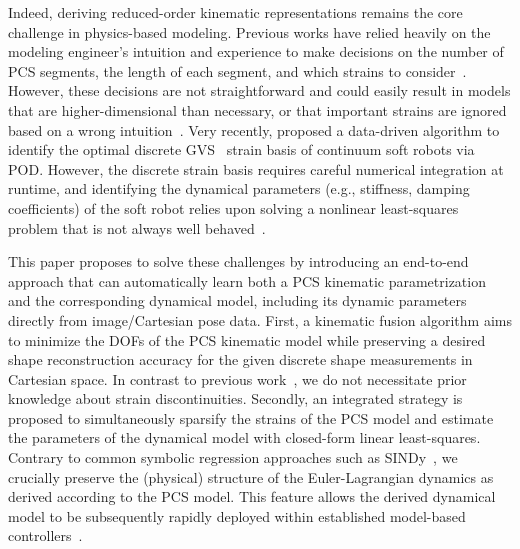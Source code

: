 %
Indeed, deriving reduced-order kinematic representations remains the core challenge in physics-based modeling. 
%
Previous works have relied heavily on the modeling engineer's intuition and experience to make decisions on the number of \gls{PCS} segments, the length of each segment, and which strains to consider~\citep{toshimitsu2021sopra}. However, these decisions are not straightforward and could easily result in models that are higher-dimensional than necessary, or that important strains are ignored based on a wrong intuition~\citep{garg2022kinematic}.
Very recently, \citet{alkayas2025soft} proposed a data-driven algorithm to identify the optimal discrete \gls{GVS}~\cite{boyer2020dynamics} strain basis of continuum soft robots via \gls{POD}. 
However, the discrete strain basis requires careful numerical integration at runtime, and identifying the dynamical parameters (e.g., stiffness, damping coefficients) of the soft robot relies upon solving a nonlinear least-squares problem that is not always well behaved~\citep{stolzle2023experimental}.

This paper proposes to solve these challenges by introducing an end-to-end approach that can automatically learn both a \gls{PCS} kinematic parametrization and the corresponding dynamical model, including its dynamic parameters directly from image/Cartesian pose data.
First, a kinematic fusion algorithm aims to minimize the \glspl{DOF} of the \gls{PCS} kinematic model while preserving a desired shape reconstruction accuracy for the given discrete shape measurements in Cartesian space. In contrast to previous work~\citep{alkayas2025soft}, we do not necessitate prior knowledge about strain discontinuities.
Secondly, an integrated strategy is proposed to simultaneously sparsify the strains of the \gls{PCS} model and estimate the parameters of the dynamical model with closed-form linear least-squares.
Contrary to common symbolic regression approaches such as \gls{SINDy}~\citep{kaiser2018sparse}, we crucially preserve the (physical) structure of the Euler-Lagrangian dynamics as derived according to the \gls{PCS} model.
This feature allows the derived dynamical model to be subsequently rapidly deployed within established model-based controllers~\citep{della2023model}.

